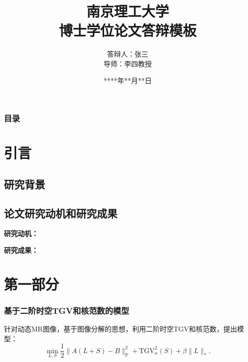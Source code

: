 \documentclass{beamer}
\title[博士学位论文答辩]{南京理工大学\\博士学位论文答辩模板}
\author[南京理工大学]{
答辩人：张三 \\
导师：李四\quad 教授
} %
\institute[南京理工大学] %
{
南京理工大学 \\ %
\medskip
**学院 
}
\date{****年**月**日} %
\begin{document}
\begin{frame}
\titlepage %
\end{frame}

\begin{frame}
\frametitle{目录}
 \end{frame}


\section{引言}
    \begin{frame}
    \end{frame}

\subsection{研究背景}


\subsection{论文研究动机和研究成果}
\begin{frame}
\textbf{研究动机：}

\textbf{研究成果：}
\end{frame}

\section{第一部分}
    \begin{frame}
    \end{frame}


\begin{frame}
	\frametitle{基于二阶时空TGV和核范数的模型}
针对动态MR图像，基于图像分解的思想，利用二阶时空TGV和核范数，提出模型：
\begin{equation}
\min_{L,S} \frac{1}{2}\|A(L+S)-B\|_{\mathrm{F}}^2+\mathrm{TGV}^2_\alpha(S)+\beta\|L\|_*.
\label{propopsed}
\end{equation}
\end{frame}
\end{document}
